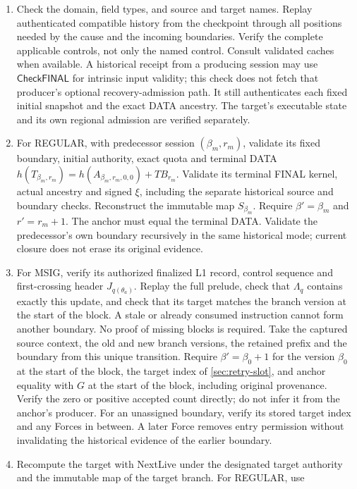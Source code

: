 \documentclass[11pt,a4paper]{article}
\newcommand{\TB}{\mathit{TB}}
\newcommand{\tagg}[1]{\ensuremath{\mathsf{#1}}}
\begin{document}
\begin{enumerate}[label=(\roman*),itemsep=2pt]
\item Check the domain, field types, and source and target names. Replay
authenticated compatible history from the checkpoint through all positions needed by
the cause and the incoming boundaries. Verify
the complete applicable controls, not only the named control. Consult
validated caches when available. A historical receipt from a producing
session may use \tagg{CheckFINAL} for intrinsic input validity; this check
does not fetch that producer's optional recovery-admission path. It still
authenticates each fixed initial snapshot and the exact DATA ancestry. The
target's executable state and its own regional admission are verified
separately.
\item For REGULAR, with predecessor session $(\beta_m,r_m)$, validate
its fixed boundary, initial authority, exact quota and terminal DATA
$h(T_{\beta_m,r_m})=h(A_{\beta_m,r_m,0,0})+\TB_{r_m}$. Validate its terminal
FINAL kernel, actual ancestry and signed $\xi$, including the separate
historical source and boundary checks. Reconstruct the immutable map
$S_{\beta_m}$. Require $\beta'=\beta_m$ and
$r'=r_m+1$. The anchor must equal the terminal DATA. Validate the
predecessor's own boundary recursively in the same historical mode;
current closure does not erase its original evidence.
\item For MSIG, verify its authorized finalized L1 record, control
sequence and first-crossing header $J_{q(\theta_a)}$. Replay the full
prelude, check that $\Lambda_q$ contains exactly this update, and check
that its target matches the branch version at the start of the block. A stale or already
consumed instruction cannot form another boundary. No proof of missing
blocks is required. Take the captured source context, the old and new
branch versions, the retained prefix and the boundary from this unique
transition. Require $\beta'=\beta_0+1$ for the version $\beta_0$ at the start of the block, the target index of
\cref{sec:retry-slot}, and anchor equality with $G$ at the start of the
block, including original provenance. Verify the zero or positive
accepted count directly; do not infer it from the anchor's producer. For
an unassigned boundary, verify its stored target index and any Forces in
between. A later Force removes entry permission without invalidating the
historical evidence of the earlier boundary.
\item Recompute the target with NextLive under the designated target
authority and the immutable map of the target branch. For REGULAR, use

\end{enumerate}
\end{document}
